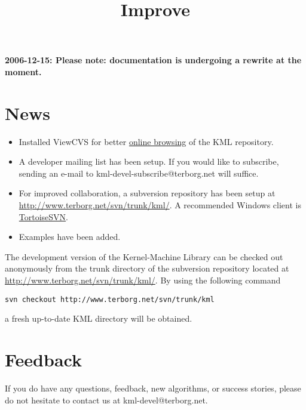\documentclass{article}
\begin{document}
\title{Improve}
\maketitle

\textbf{2006-12-15: Please note: documentation is undergoing a rewrite at the moment.}

\section*{News}

\begin{itemize}

\item Installed ViewCVS for better 
\href{http://www.terborg.net/cgi-bin/viewcvs.cgi/trunk/kml/}{online browsing}
of the KML repository.
\item A developer mailing list has been setup. If you would like to subscribe, sending an
e-mail to kml-devel-subscribe@terborg.net will suffice.
\item For improved collaboration, a subversion repository has been 
setup at \href{http://www.terborg.net/svn/trunk/kml/}{http://www.terborg.net/svn/trunk/kml/}. A
recommended Windows client is \href{http://tortoisesvn.tigris.org/}{TortoiseSVN}.
\item Examples have been added.

\end{itemize}


The development version of the Kernel-Machine Library can be checked out anonymously from 
the trunk directory of the subversion repository located at 
\href{http://www.terborg.net/svn/trunk/kml/}{http://www.terborg.net/svn/trunk/kml/}. By using the following command
\begin{verbatim}
svn checkout http://www.terborg.net/svn/trunk/kml
\end{verbatim}
a fresh up-to-date KML directory will be obtained. 


\section*{Feedback}

If you do have any questions, feedback, new algorithms, or success stories, 
please do not hesitate to contact us at kml-devel@terborg.net.




\end{document}
